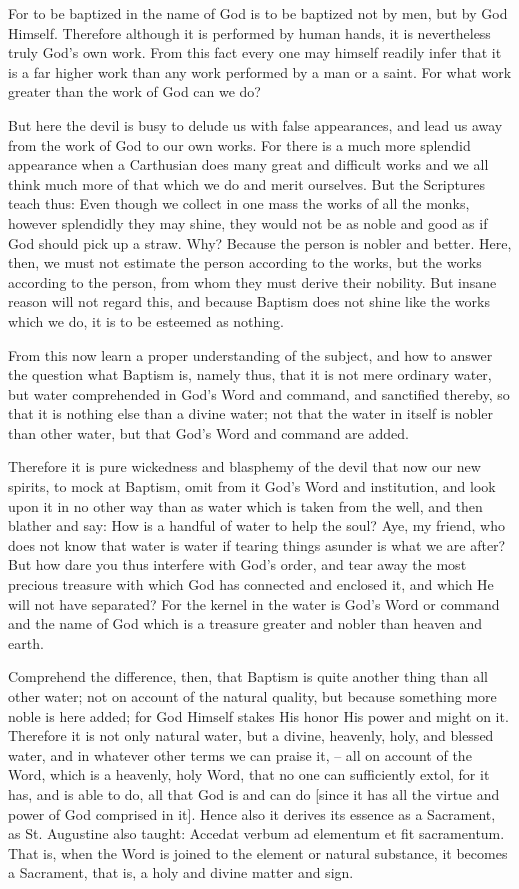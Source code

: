 For to be baptized in the name of God is to be baptized not by men, but
by God Himself. Therefore although it is performed by human hands, it
is nevertheless truly God's own work. From this fact every one may
himself readily infer that it is a far higher work than any work
performed by a man or a saint. For what work greater than the work of
God can we do?

But here the devil is busy to delude us with false appearances, and
lead us away from the work of God to our own works. For there is a much
more splendid appearance when a Carthusian does many great and
difficult works and we all think much more of that which we do and
merit ourselves. But the Scriptures teach thus: Even though we collect
in one mass the works of all the monks, however splendidly they may
shine, they would not be as noble and good as if God should pick up a
straw. Why? Because the person is nobler and better. Here, then, we
must not estimate the person according to the works, but the works
according to the person, from whom they must derive their nobility. But
insane reason will not regard this, and because Baptism does not shine
like the works which we do, it is to be esteemed as nothing.

From this now learn a proper understanding of the subject, and how to
answer the question what Baptism is, namely thus, that it is not mere
ordinary water, but water comprehended in God's Word and command, and
sanctified thereby, so that it is nothing else than a divine water; not
that the water in itself is nobler than other water, but that God's
Word and command are added.

Therefore it is pure wickedness and blasphemy of the devil that now our
new spirits, to mock at Baptism, omit from it God's Word and
institution, and look upon it in no other way than as water which is
taken from the well, and then blather and say: How is a handful of
water to help the soul? Aye, my friend, who does not know that water is
water if tearing things asunder is what we are after? But how dare you
thus interfere with God's order, and tear away the most precious
treasure with which God has connected and enclosed it, and which He
will not have separated? For the kernel in the water is God's Word or
command and the name of God which is a treasure greater and nobler than
heaven and earth.

Comprehend the difference, then, that Baptism is quite another thing
than all other water; not on account of the natural quality, but
because something more noble is here added; for God Himself stakes His
honor His power and might on it. Therefore it is not only natural
water, but a divine, heavenly, holy, and blessed water, and in whatever
other terms we can praise it, -- all on account of the Word, which is a
heavenly, holy Word, that no one can sufficiently extol, for it has,
and is able to do, all that God is and can do [since it has all the
virtue and power of God comprised in it]. Hence also it derives its
essence as a Sacrament, as St. Augustine also taught: Accedat verbum ad
elementum et fit sacramentum. That is, when the Word is joined to the
element or natural substance, it becomes a Sacrament, that is, a holy
and divine matter and sign.

